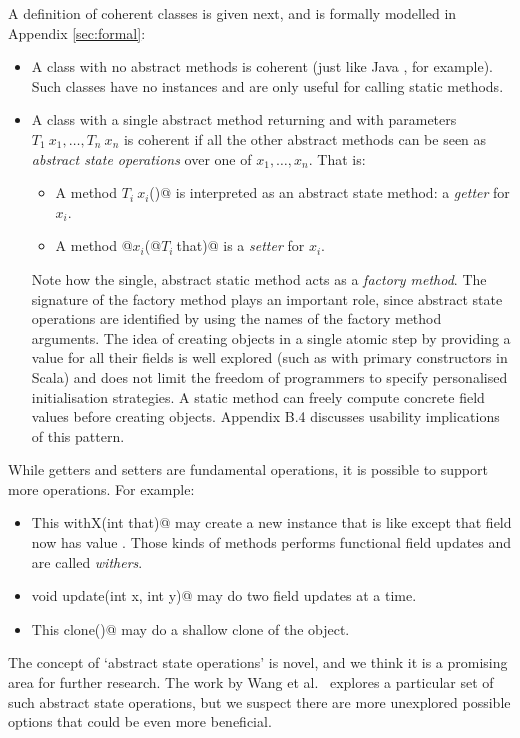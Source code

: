 \noindent A definition of coherent
classes is given next, and is formally modelled in Appendix \ref{sec:formal}:
\begin{itemize}
\item A class with no abstract methods is coherent (just like Java
  \Q@Math@, for example). Such classes have no instances and are only useful for calling static methods.
\item A class with a single abstract \Q@static@ method 
returning \Q@This@ and with parameters $T_1\ x_1, \ldots, T_n\ x_n$
is coherent if all the other abstract methods can be seen as \emph{abstract state
operations} over one of $x_1, \ldots, x_n$.
That is:
\begin{itemize}
\item A method $T_i\ x_i$\Q@()@ is interpreted as an abstract state method: a \emph{getter} for $x_i$.
\item A method \Q@void @$x_i$\Q@(@$T_i\ $\Q@ that)@ is a \emph{setter} for $x_i$.
\end{itemize}

Note how the single, abstract static
method acts as a \emph{factory method}.
The signature of the factory method plays an important role, since
abstract state operations are identified by using the names of the
factory method arguments.
The idea of creating objects in a single atomic step by providing a value for all their fields is well explored (such as with primary constructors in Scala) and does not limit the freedom of programmers to specify personalised initialisation strategies.
A static method can freely compute concrete field values before creating objects. Appendix B.4 discusses usability implications of this pattern.
\end{itemize}
\noindent
While getters and setters are fundamental operations, it is possible to
support more operations. For example:
\begin{itemize}
\item \Q@method This withX(int that)@
may create a new instance that is like \Q@this@ except that field \Q@x@ now has value \Q@that@.
Those kinds of methods 
performs functional field updates
and are called \emph{withers}.
\item \Q@method void update(int x, int y)@
may do two field updates at a time.
\item\Q@method This clone()@ may do a shallow clone of the object.
\end{itemize}

The concept of `abstract state operations'
is novel, and we think it
is a promising area for further research.
The work by Wang et al.~\cite{wang2016classless} explores a particular
set of such abstract state operations,
but we suspect there are more unexplored possible options that could be even more beneficial.

